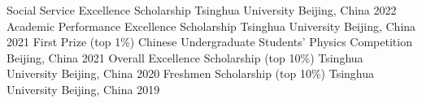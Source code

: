


\begin{cvhonors}

  \cvhonor
    {Social Service Excellence Scholarship} %
    {Tsinghua University} %
    {Beijing, China} %
    {2022} %
  \cvhonor
    {Academic Performance Excellence Scholarship} %
    {Tsinghua University} %
    {Beijing, China} %
    {2021} %
  \cvhonor
    {First Prize (top 1\%)} %
    {Chinese Undergraduate Students’ Physics Competition} %
    {Beijing, China} %
    {2021} %
  \cvhonor
    {Overall Excellence Scholarship (top 10\%)} %
    {Tsinghua University} %
    {Beijing, China} %
    {2020} %
  \cvhonor
    {Freshmen Scholarship (top 10\%)} %
    {Tsinghua University} %
    {Beijing, China} %
    {2019} %
\end{cvhonors}